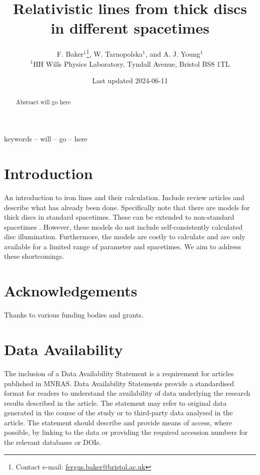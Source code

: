\documentclass[fleqn,usenatbib,useAMS]{mnras}
\title[Relativistic disc lines]{Relativistic lines from thick discs in different spacetimes}
\author[F. Baker, et al.]{F. Baker$^{1}$\thanks{Contact e-mail: \href{mailto:fergus.baker@bristol.ac.uk}{fergus.baker@bristol.ac.uk}}, W. Tarnopolska$^{1}$, and A. J. Young$^{1}$ \\
$^{1}$HH Wills Physics Laboratory, Tyndall Avenue, Bristol BS8 1TL}
\date{Last updated 2024-06-11}
\begin{document}
\label{firstpage}
\pagerange{\pageref{firstpage}--\pageref{lastpage}}
\maketitle

\begin{abstract}
Abstract will go here
\end{abstract}

\begin{keywords}
keywords -- will -- go -- here
\end{keywords}

\section{Introduction}

An introduction to iron lines and their calculation. Include review articles and describe what has already been done. Specifically note that there are models for thick discs \citep{taylor2018} in standard spacetimes. These can be extended to non-standard spacetimes \citep{abdikamalov2020}. However, these models do not include self-consistently calculated disc illumination. Furthermore, the models are costly to calculate and are only available for a limited range of parameter and spacetimes. We aim to address these shortcomings.

\section*{Acknowledgements}

Thanks to various funding bodies and grants.

\section*{Data Availability}
 
The inclusion of a Data Availability Statement is a requirement for articles published in MNRAS. Data Availability Statements provide a standardised format for readers to understand the availability of data underlying the research results described in the article. The statement may refer to original data generated in the course of the study or to third-party data analysed in the article. The statement should describe and provide means of access, where possible, by linking to the data or providing the required accession numbers for the relevant databases or DOIs.




\bsp
\label{lastpage}
\end{document}
